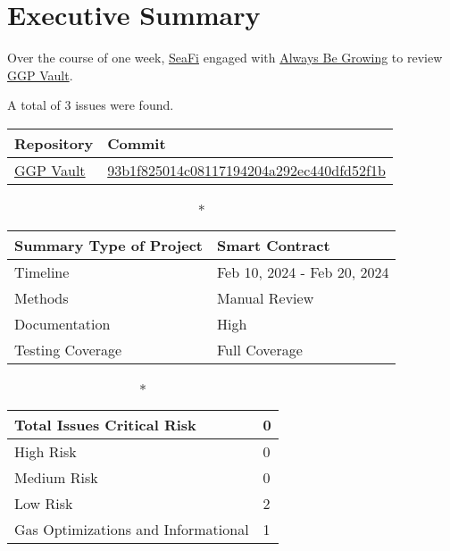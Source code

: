 \hypertarget{executive-summary}{%
\section{Executive Summary}\label{executive-summary}}

Over the course of one week, \href{https://seafi.app}{SeaFi} engaged with
\href{http://abg.garden}{Always Be Growing} to review
\href{https://github.com/SeaFi-Labs/GGP-Vault}{GGP Vault}. 

A total of 3 issues were found. 

\begin{longtable}[c]{|l|l|}
\hline \textbf{Repository} & \textbf{Commit} \\

\hline
\href{https://github.com/SeaFi-Labs/GGP-Vault}{GGP Vault} &
\href{https://github.com/SeaFi-Labs/GGP-Vault/commit/93b1f825014c08117194204a292ec440dfd52f1b}{93b1f825014c08117194204a292ec440dfd52f1b} \\
\hline
\end{longtable}

\begin{longtable}[]{|l|l|}

\caption*{\textbf{Summary}}
\hline Type of Project & Smart Contract \\   
\hline Timeline & Feb 10, 2024 - Feb 20, 2024   \\
\hline Methods & Manual Review \\
\hline Documentation & High \\
\hline Testing Coverage & Full Coverage \\
\hline
\end{longtable}


\begin{longtable}[]{|l|l|}
\caption*{\textbf{Total Issues}}
\hline Critical Risk & 0 \\
\hline High Risk & 0 \\
\hline Medium Risk & 0 \\ 
\hline Low Risk & 2 \\
\hline Gas Optimizations and Informational & 1 \\
\hline
\end{longtable}

